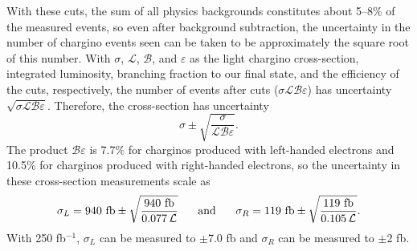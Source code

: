 \documentclass[12pt]{article}
\begin{document}
With these cuts, the sum of all physics backgrounds constitutes about
5--8\% of the measured events, so even after background subtraction,
the uncertainty in the number of chargino events seen can be taken to
be approximately the square root of this number.  With $\sigma$,
$\mathcal{L}$, $\mathcal{B}$, and $\varepsilon$ as the light chargino
cross-section, integrated luminosity, branching fraction to our final
state, and the efficiency of the cuts, respectively, the number of
events after cuts ($\sigma\mathcal{L}\mathcal{B}\varepsilon$) has
uncertainty $\sqrt{\sigma\mathcal{L}\mathcal{B}\varepsilon}$.
Therefore, the cross-section has uncertainty
\begin{equation}
  \sigma \pm \sqrt{\frac{\sigma}{\mathcal{L}\mathcal{B}\varepsilon}}.
\end{equation}
The product $\mathcal{B}\varepsilon$ is 7.7\% for charginos produced
with left-handed electrons and 10.5\% for charginos produced with
right-handed electrons, so the uncertainty in these cross-section
measurements scale as
\begin{equation}
  \sigma_L = 940\mbox{ fb} \pm \sqrt{\frac{940\mbox{ fb}}{0.077 \, \mathcal{L}}}
  \mbox{\hspace{0.5 cm} and \hspace{0.5 cm}}
  \sigma_R = 119\mbox{ fb} \pm \sqrt{\frac{119\mbox{ fb}}{0.105 \, \mathcal{L}}}.
\end{equation}
With 250 fb$^{-1}$, $\sigma_L$ can be measured to $\pm$7.0 fb and
$\sigma_R$ can be measured to $\pm$2 fb.
\end{document}
